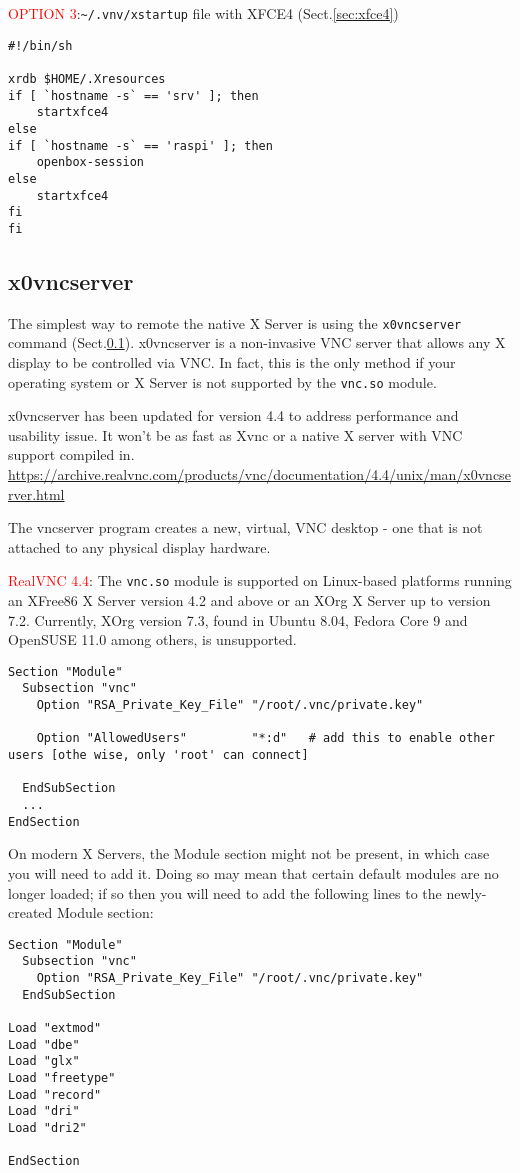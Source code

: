 \textcolor{red}{OPTION 3}:\verb!~/.vnv/xstartup!  file with XFCE4
(Sect.\ref{sec:xfce4})
\begin{verbatim}
#!/bin/sh

xrdb $HOME/.Xresources
if [ `hostname -s` == 'srv' ]; then
    startxfce4
else
if [ `hostname -s` == 'raspi' ]; then
    openbox-session
else
    startxfce4
fi
fi
\end{verbatim}




\subsection{x0vncserver}
\label{sec:x0vncserver}


The simplest way to remote the native X Server is using the \verb!x0vncserver!
command (Sect.\ref{sec:x0vncserver}). x0vncserver is a non-invasive VNC server
that allows any X display to be controlled via VNC. 
In fact, this is the only method if your operating system or X Server is not
supported by the \verb!vnc.so! module.

x0vncserver has been updated for version 4.4 to address performance and
usability issue. It won't be as fast as Xvnc or a native X server with VNC
support compiled in.
\url{https://archive.realvnc.com/products/vnc/documentation/4.4/unix/man/x0vncserver.html}


The vncserver program creates a new, virtual, VNC desktop - one that is not
attached to any physical display hardware. 

\textcolor{red}{RealVNC 4.4}:  The \verb!vnc.so! module is supported on
Linux-based platforms running an XFree86 X Server version 4.2 and above or an
XOrg X Server up to version 7.2.
Currently, XOrg version 7.3, found in Ubuntu 8.04, Fedora Core 9 and OpenSUSE
11.0 among others, is unsupported.

\begin{verbatim}
Section "Module"
  Subsection "vnc"
    Option "RSA_Private_Key_File" "/root/.vnc/private.key"

    Option "AllowedUsers"         "*:d"   # add this to enable other users [othe wise, only 'root' can connect]
    
  EndSubSection
  ...
EndSection
\end{verbatim}


On modern X Servers, the Module section might not be present, in which case you
will need to add it. Doing so may mean that certain default modules are no
longer loaded; if so then you will need to add the following lines to the
newly-created Module section: 
\begin{verbatim}
Section "Module"
  Subsection "vnc"
    Option "RSA_Private_Key_File" "/root/.vnc/private.key"
  EndSubSection

Load "extmod"
Load "dbe"
Load "glx"
Load "freetype"
Load "record"
Load "dri"
Load "dri2"

EndSection
\end{verbatim}

